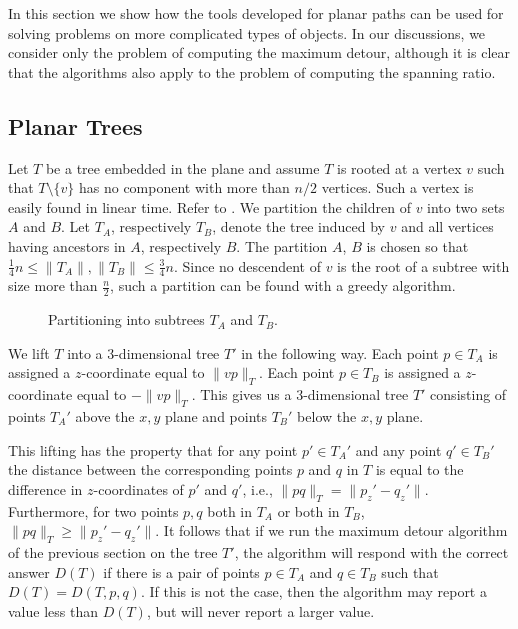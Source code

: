 \documentclass[lotsofwhite]{patmorin}
\begin{document}
In this section we show how the tools developed for planar paths can
be used for solving problems on more complicated types of objects.  In
our discussions, we consider only the problem of computing the maximum
detour, although it is clear that the algorithms also apply to the
problem of computing the spanning ratio.

\subsection{Planar Trees}

Let $T$ be a tree embedded in the plane and assume $T$ is rooted at a
vertex $v$ such that $T\setminus\{v\}$ has no component with more than
$n/2$ vertices.  Such a vertex is easily found in linear time. Refer
to .  We partition the children of $v$ into two sets $A$
and $B$.  Let $T_A$, respectively $T_B$, denote the tree induced by
$v$ and all vertices having ancestors in $A$, respectively $B$.  The
partition $A$, $B$ is chosen so that
$\frac{1}{4}n\le\|T_A\|,\|T_B\|\le\frac{3}{4}n$.  Since no descendent of
$v$ is the root of a subtree with size more than $\frac{n}{2}$, such a
partition can be found with a greedy algorithm.

\begin{figure}
\caption{Partitioning into subtrees $T_A$ and $T_B$.}
\end{figure}

We lift $T$ into a 3-dimensional tree $T'$ in the following way.  Each
point $p\in T_A$ is assigned a $z$-coordinate equal to $\|vp\|_T$.  Each
point $p\in T_B$ is assigned a $z$-coordinate equal to $-\|vp\|_T$.
This gives us a 3-dimensional tree $T'$ consisting of points $T_A'$
above the $x,y$ plane and points $T_B'$ below the $x,y$ plane.

This lifting has the property that for any point $p'\in T_A'$ and any
point $q'\in T_B'$ the distance between the corresponding points $p$
and $q$ in $T$ is equal to the difference in $z$-coordinates of $p'$
and $q'$, i.e., $\|pq\|_T=\|p_z'-q_z'\|$.  Furthermore, for two points
$p,q$ both in $T_A$ or both in $T_B$, $\|pq\|_T\ge\|p_z'-q_z'\|$.  It
follows that if we run the maximum detour algorithm of the previous
section on the tree $T'$, the algorithm will respond with the correct
answer $D(T)$ if there is a pair of points $p\in T_A$ and $q\in T_B$
such that $D(T)=D(T,p,q)$.  If this is not the case, then the
algorithm may report a value less than $D(T)$, but will never report a
larger value.
\end{document}
